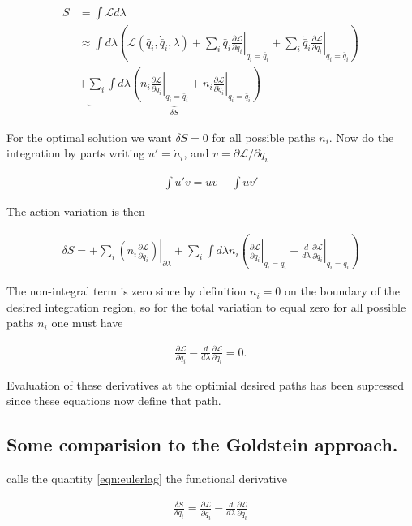 \documentclass{article}
\newcommand{\LL}[0]{\mathcal{L}}
\newcommand{\qdot}[0]{\dot{q}}
\newcommand{\ndot}[0]{\dot{n}}
\newcommand{\qbar}[0]{\bar{q}}
\newcommand{\qdotbar}[0]{\dot{\bar{q}}}
\newcommand{\PD}[2]{\frac{\partial {#2}}{\partial {#1}}}
\begin{document}
\begin{align*}
S &= \int \LL d\lambda \\
&\approx
\int d\lambda 
\left(
\LL(\qbar_i, \qdotbar_i, \lambda)
+ \sum_i \qbar_i \left. \PD{q_i}{\LL} \right\vert_{q_i = \qbar_i}
+ \sum_i \qdotbar_i \left. \PD{\qdot_i}{\LL} \right\vert_{q_i = \qbar_i}
\right) \\
&+
\underbrace{
\sum_i \int d\lambda
\left(
n_i \left. \PD{q_i}{\LL} \right\vert_{q_i = \qbar_i}
+\ndot_i \left. \PD{\qdot_i}{\LL} \right\vert_{q_i = \qbar_i}
\right)
}_{\delta S}
\end{align*}

For the optimal solution we want $\delta S = 0$ for all possible paths $n_i$.  Now do the integration by parts writing
$u' = \ndot_i$, and $v = \partial \LL/{\partial \qdot_i}$ 

\begin{align*}
\int u' v = u v - \int u v'
\end{align*}

The action variation is then

\begin{align*}
\delta S =
+ \sum_i \left. \left( n_i \PD{\qdot_i}{\LL} \right) \right\vert_{\partial \lambda}
+ \sum_i \int d\lambda n_i
\left(
\left. \PD{q_i}{\LL} \right\vert_{q_i = \qbar_i}
-\frac{d}{d\lambda} \left. \PD{\qdot_i}{\LL} \right\vert_{q_i = \qbar_i}
\right)
\end{align*}

The non-integral term is zero since by definition $n_i = 0$ on the boundary of the desired integration region, so for the
total variation to equal zero for all possible paths $n_i$ one must have

\begin{align}\label{eqn:eulerlag}
\PD{q_i}{\LL} -\frac{d}{d\lambda} \PD{\qdot_i}{\LL} = 0.
\end{align}

Evaluation of these derivatives at the optimial desired paths has been supressed since these equations now define that path.

\subsection{ Some comparision to the Goldstein approach. }

\cite{goldstein1951cm} calls the quantity \ref{eqn:eulerlag} the functional derivative

\begin{align*}
\frac{\delta S}{\delta q_i} = \PD{q_i}{\LL} -\frac{d}{d\lambda} \PD{\qdot_i}{\LL}
\end{align*}
\end{document}
